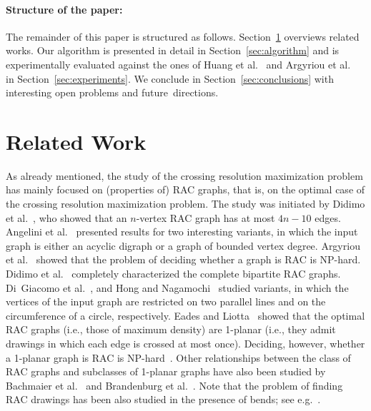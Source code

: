 \documentclass[runningheads]{llncs}
\begin{document}
\paragraph{Structure of the paper:}
The remainder of this paper is structured as follows. Section~\ref{sec:relatedwork} overviews related works. 
Our algorithm is presented in detail in Section~\ref{sec:algorithm} and is experimentally evaluated against the ones of Huang et al.~\cite{DBLP:journals/vlc/HuangEHL13} and Argyriou et al.~\cite{DBLP:journals/cj/ArgyriouBS13} in Section~\ref{sec:experiments}. We conclude in Section~\ref{sec:conclusions} with interesting open problems and future~directions.
 
\section{Related Work}
\label{sec:relatedwork}

As already mentioned, the study of the crossing resolution maximization problem has mainly focused on (properties of) RAC graphs, that is, on the optimal case of the crossing resolution maximization problem. The study was initiated by Didimo et al.~\cite{DBLP:journals/tcs/DidimoEL11}, who showed that an $n$-vertex RAC graph has at most $4n-10$ edges. 
Angelini et al.~\cite{DBLP:journals/jgaa/AngeliniCDFBKS11} presented results for two interesting variants, in which the input graph is either an acyclic digraph or a graph of bounded vertex degree. Argyriou et al.~\cite{DBLP:journals/jgaa/ArgyriouBS12} showed that the problem of deciding whether a graph is RAC is NP-hard. Didimo et al.~\cite{DBLP:journals/ipl/DidimoEL10} completely characterized the complete bipartite RAC graphs. Di~Giacomo et al.~\cite{DBLP:journals/algorithmica/GiacomoDEL14}, and Hong and Nagamochi~\cite{DBLP:conf/wg/HongN15} studied variants, in which the vertices of the input graph are restricted on two parallel lines and on the circumference of a circle, respectively. Eades and Liotta~\cite{DBLP:journals/dam/EadesL13} showed that the optimal RAC graphs (i.e., those of maximum density) are 1-planar (i.e., they admit drawings in which each edge is crossed at most once). Deciding, however, whether a 1-planar graph is RAC is NP-hard~\cite{DBLP:journals/tcs/BekosDLMM17}. Other relationships between the class of RAC graphs and subclasses of 1-planar graphs have also been studied by Bachmaier et al.~\cite{DBLP:journals/dam/BachmaierBHNR17} and Brandenburg et al.~\cite{DBLP:journals/tcs/BrandenburgDEKL16}. Note that the problem of finding RAC drawings has been also studied in the presence of bends; see e.g.~\cite{DBLP:journals/jgaa/AngeliniCDFBKS11,DBLP:journals/comgeo/ArikushiFKMT12,DBLP:journals/tcs/DidimoEL11,DBLP:journals/mst/GiacomoDLM11}. 
\end{document}
